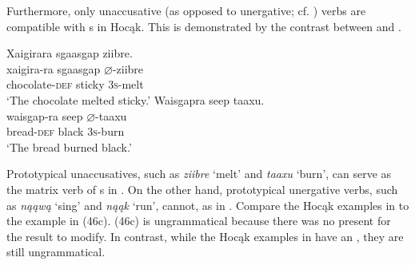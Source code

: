 \documentclass[output=paper]{LSP/langsci}
\begin{document}
Furthermore, only unaccusative (as opposed to unergative; cf. \citealt{Perlmutter1978}) verbs are compatible with s in Hocąk. This is demonstrated by the contrast between  and .
 

\begin{exe}
\ex\label{ex:jrs:48}
\begin{xlist}
\ex     
\glll Xaigirara			sgaasgap		ziibre.\\
xaigira-ra			sgaasgap		$\varnothing$-ziibre \\
	chocolate-\textsc{def}	sticky			\textsc{3s}-melt \\
\trans `The chocolate melted sticky.'
\ex  
\glll Waisgapra		seep		taaxu.\\
waisgap-ra		seep		$\varnothing$-taaxu \\
	bread-\textsc{def}		black		\textsc{3s}-burn \\
\trans `The bread burned black.'
\end{xlist}
\end{exe}
\begin{exe}
\ex\label{ex:jrs:49}
\begin{xlist}
\end{xlist}
\end{exe}

 
Prototypical unaccusatives, such as \textit{ziibre} `melt' and \textit{taaxu} `burn', can serve as the matrix verb of s in . On the other hand, prototypical unergative verbs, such as \textit{nąąwą} `sing' and \textit{nąąk} `run', cannot, as in . Compare the Hocąk examples in  to the  example in (46c). (46c) is ungrammatical because there was no  present for the result  to modify. In contrast, while the Hocąk examples in  have an , they are still ungrammatical.
	
\end{document}
